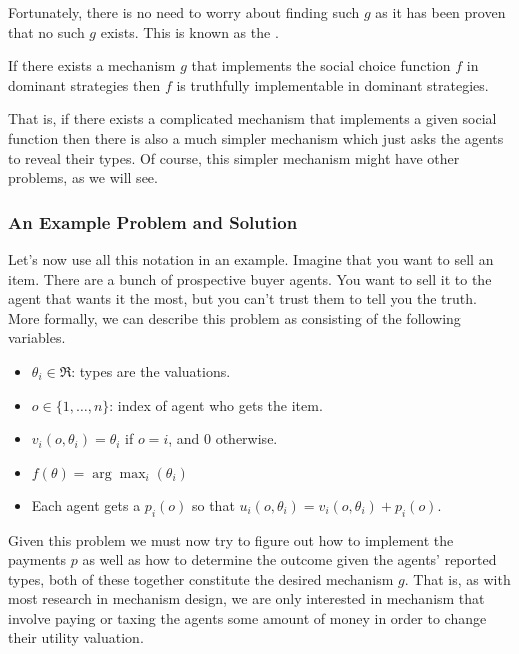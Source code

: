 Fortunately, there is no need to worry about finding such $g$ as it
has been proven that no such $g$ exists. This is known as the
.

\begin{theorem}
  If there exists a mechanism $g$ that implements the social choice
  function $f$ in dominant strategies then $f$ is truthfully
  implementable in dominant strategies.
  \label{def:revelation}
\end{theorem}

That is, if there exists a complicated mechanism that implements a
given social function then there is also a much simpler mechanism
which just asks the agents to reveal their types. Of course, this
simpler mechanism might have other problems, as we will see.


\subsubsection{An Example Problem and Solution}

Let's now use all this notation in an example. Imagine that you want
to sell an item. There are a bunch of prospective buyer agents. You
want to sell it to the agent that wants it the most, but you can't
trust them to tell you the truth. More formally, we can describe this
problem as consisting of the following variables.


\begin{itemize}
\item $\theta_i \in \Re$: types are the valuations. 
  
\item $o \in \{1,\ldots , n\}$: index of agent who gets the
  item. 
  
\item $v_i(o, \theta_i) = \theta_i$ if $o = i$, and $0$ otherwise.
  
\item $f(\theta) = \arg \max_i(\theta_i)$

\item Each agent gets a $p_i(o)$ so that
  $u_i(o, \theta_i) = v_i(o, \theta_i) + p_i(o)$.

\end{itemize}

Given this problem we must now try to figure out how to implement the
payments $p$ as well as how to determine the outcome given the agents'
reported types, both of these together constitute the desired
mechanism $g$. That is, as with most research in mechanism design, we
are only interested in mechanism that involve paying or taxing the
agents some amount of money in order to change their utility
valuation.

